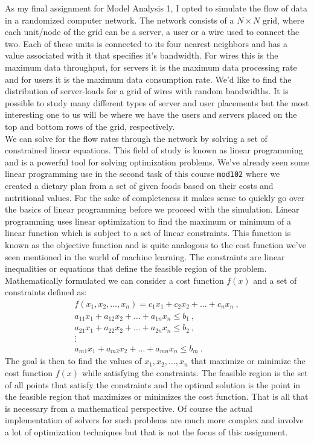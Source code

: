 \documentclass[10pt, titlepage, a4paper]{article}
\begin{document}
As my final assignment for Model Analysis 1, I opted to simulate the flow of data in a randomized computer network. The network 
consists of a $N\times N$ grid, where each unit/node of the grid can be a server, a user or a wire used to connect the two. Each of these 
units is connected to its four nearest neighbors and has a value associated with it that specifies it's bandwidth. For wires this is the 
maximum data throughput, for servers it is the maximum data processing rate and for users it is the maximum data consumption rate. We'd like 
to find the distribution of server-loads for a grid of wires with random bandwidths. It is possible to study many different types of 
server and user placements but the most interesting one to us will be where we have the users and servers placed on the top and bottom 
rows of the grid, respectively. \\

We can solve for the flow rates through the network by solving a set of constrained linear equations. This field of study is
known as linear programming and is a powerful tool for solving optimization problems. We've already seen some linear programming 
use in the second task of this course \texttt{mod102} where we created a dietary plan from a set of given foods based on their costs 
and nutritional values. For the sake of completeness it makes sense to quickly go over the basics of linear programming before we
proceed with the simulation. Linear programming uses linear optimization to find the maximum or minimum of a linear function
which is subject to a set of linear constraints. This function is known as the objective function and is quite analogous to the cost 
function we've seen mentioned in the world of machine learning. The constraints are linear inequalities or equations that
define the feasible region of the problem. Mathematically formulated we can consider a cost function $f(x)$ and a set of 
constraints defined as:
%
\begin{gather*}
    f(x_1, x_2, \dots, x_n) = c_1x_1 + c_2x_2 + \dots + c_nx_n\>, \\
    a_{11}x_1 + a_{12}x_2 + \dots + a_{1n}x_n \leq b_1\>, \\
    a_{21}x_1 + a_{22}x_2 + \dots + a_{2n}x_n \leq b_2\>, \\
    \vdots \\
    a_{m1}x_1 + a_{m2}x_2 + \dots + a_{mn}x_n \leq b_m\>.
\end{gather*}
%
The goal is then to find the values of $x_1, x_2, \dots, x_n$ that maximize or minimize the cost function $f(x)$ while satisfying
the constraints. The feasible region is the set of all points that satisfy the constraints and the optimal solution is the point in
the feasible region that maximizes or minimizes the cost function. That is all that is necessary from a mathematical perspective. Of course 
the actual implementation of solvers for such problems are much more complex and involve a lot of optimization techniques but that is 
not the focus of this assignment. \\
\end{document}
